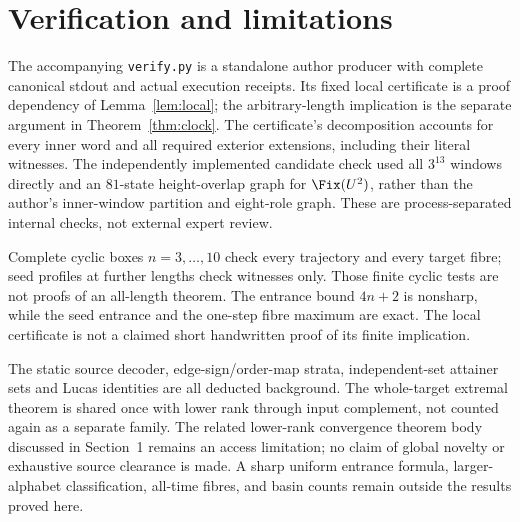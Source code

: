 \section{Verification and limitations}

The accompanying \texttt{verify.py} is a standalone author producer with
complete canonical stdout and actual execution receipts. Its fixed
local certificate is a proof dependency of Lemma~\ref{lem:local};
the arbitrary-length implication is the separate argument in
Theorem~\ref{thm:clock}. The certificate's decomposition accounts for
every inner word and all required exterior extensions, including their
literal witnesses. The independently implemented candidate check used
all $3^{13}$ windows directly and an $81$-state height-overlap graph for
$\Fix(U^2)$, rather than the author's inner-window partition and
eight-role graph. These are process-separated internal checks, not
external expert review.

Complete cyclic boxes $n=3,\ldots,10$ check every trajectory and every
target fibre; seed profiles at further lengths check witnesses only.
Those finite cyclic tests are not proofs of an all-length theorem.
The entrance bound $4n+2$ is nonsharp, while the seed entrance and the
one-step fibre maximum are exact. The local certificate is not a
claimed short handwritten proof of its finite implication.

The static source decoder, edge-sign/order-map strata, independent-set
attainer sets and Lucas identities are all deducted background. The
whole-target extremal theorem is shared once with lower rank through
input complement, not counted again as a separate family. The related
lower-rank convergence theorem body discussed in Section~1 remains an
access limitation; no claim of global novelty or exhaustive source
clearance is made. A sharp uniform entrance formula, larger-alphabet
classification, all-time fibres, and basin counts remain outside the
results proved here.
